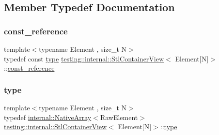 \subsection{Member Typedef Documentation}
\mbox{\label{classtesting_1_1internal_1_1_stl_container_view_3_01_element[_n]_4_a481e6ab99316939484fad9c561af5e28}} 
\subsubsection{\texorpdfstring{const\+\_\+reference}{const\_reference}}
{\footnotesize\ttfamily template$<$typename Element , size\+\_\+t N$>$ \\
typedef const \hyperlink{classtesting_1_1internal_1_1_stl_container_view_3_01_element[_n]_4_a364efca99cc5a02829b4e3413c506b09}{type} \hyperlink{classtesting_1_1internal_1_1_stl_container_view}{testing\+::internal\+::\+Stl\+Container\+View}$<$ Element\mbox{[}N\mbox{]}$>$\+::\hyperlink{classtesting_1_1internal_1_1_stl_container_view_3_01_element[_n]_4_a481e6ab99316939484fad9c561af5e28}{const\+\_\+reference}}

\mbox{\label{classtesting_1_1internal_1_1_stl_container_view_3_01_element[_n]_4_a364efca99cc5a02829b4e3413c506b09}} 
\subsubsection{\texorpdfstring{type}{type}}
{\footnotesize\ttfamily template$<$typename Element , size\+\_\+t N$>$ \\
typedef \hyperlink{classtesting_1_1internal_1_1_native_array}{internal\+::\+Native\+Array}$<$Raw\+Element$>$ \hyperlink{classtesting_1_1internal_1_1_stl_container_view}{testing\+::internal\+::\+Stl\+Container\+View}$<$ Element\mbox{[}N\mbox{]}$>$\+::\hyperlink{classtesting_1_1internal_1_1_stl_container_view_3_01_element[_n]_4_a364efca99cc5a02829b4e3413c506b09}{type}}



